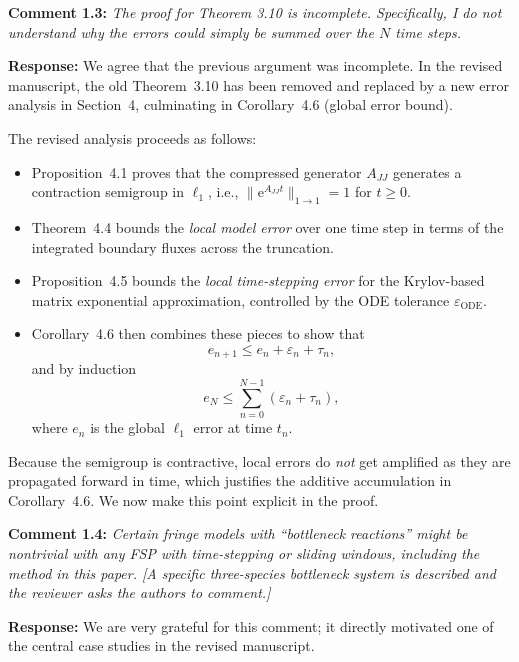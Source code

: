 \documentclass[11pt]{article}
\begin{document}
\vspace{0.5em}

\noindent\textbf{Comment 1.3:} \textit{The proof for Theorem 3.10 is incomplete. Specifically, I do not
understand why the errors could simply be summed over the $N$ time steps.}

\textbf{Response:} We agree that the previous argument was incomplete. In the revised
manuscript, the old Theorem~3.10 has been removed and replaced by a new error
analysis in Section~4, culminating in Corollary~4.6 (global error bound).

The revised analysis proceeds as follows:

\begin{itemize}
  \item Proposition~4.1 proves that the compressed generator $A_{JJ}$ generates a
        contraction semigroup in $\ell_1$, i.e.,
        $\|\mathrm{e}^{A_{JJ} t}\|_{1\to 1} = 1$ for $t\ge 0$.
  \item Theorem~4.4 bounds the \emph{local model error} over one time step in terms
        of the integrated boundary fluxes across the truncation.
  \item Proposition~4.5 bounds the \emph{local time-stepping error} for the
        Krylov-based matrix exponential approximation, controlled by the ODE
        tolerance $\varepsilon_{\mathrm{ODE}}$.
  \item Corollary~4.6 then combines these pieces to show that
        \[
          e_{n+1} \le e_n + \varepsilon_n + \tau_n,
        \]
        and by induction
        \[
          e_N \le \sum_{n=0}^{N-1} (\varepsilon_n + \tau_n),
        \]
        where $e_n$ is the global $\ell_1$ error at time $t_n$.
\end{itemize}

Because the semigroup is contractive, local errors do \emph{not} get amplified as
they are propagated forward in time, which justifies the additive accumulation in
Corollary~4.6. We now make this point explicit in the proof.

\vspace{0.5em}

\noindent\textbf{Comment 1.4:} \textit{Certain fringe models with “bottleneck reactions” might be nontrivial
with any FSP with time-stepping or sliding windows, including the method in this
paper. [A specific three-species bottleneck system is described and the reviewer
asks the authors to comment.]}

\textbf{Response:} We are very grateful for this comment; it directly motivated one of
the central case studies in the revised manuscript.
\end{document}
